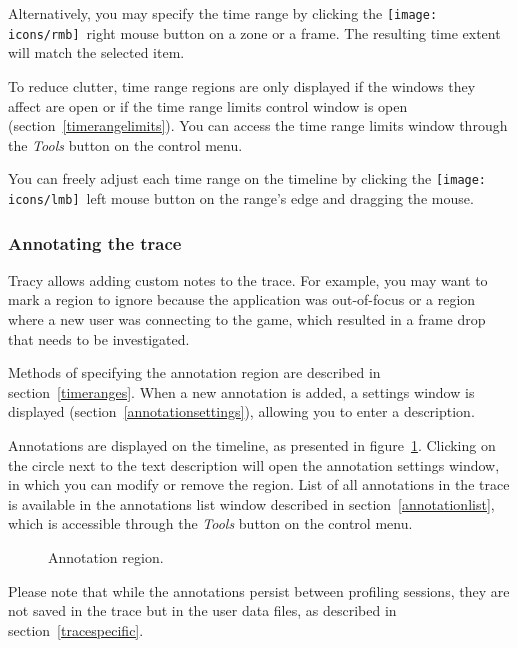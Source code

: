 \documentclass[hidelinks,titlepage,a4paper,twoside]{article}
\newcommand{\LMB}{\texttt{[image: icons/lmb]}}
\newcommand{\RMB}{\texttt{[image: icons/rmb]}}
\begin{document}
Alternatively, you may specify the time range by clicking the \RMB{}~right mouse button on a zone or a frame. The resulting time extent will match the selected item.

To reduce clutter, time range regions are only displayed if the windows they affect are open or if the time range limits control window is open (section~\ref{timerangelimits}). You can access the time range limits window through the \emph{\faTools{} Tools} button on the control menu.

You can freely adjust each time range on the timeline by clicking the \LMB{}~left mouse button on the range's edge and dragging the mouse.

\subsubsection{Annotating the trace}
\label{annotatingtrace}

Tracy allows adding custom notes to the trace. For example, you may want to mark a region to ignore because the application was out-of-focus or a region where a new user was connecting to the game, which resulted in a frame drop that needs to be investigated.

Methods of specifying the annotation region are described in section~\ref{timeranges}. When a new annotation is added, a settings window is displayed (section~\ref{annotationsettings}), allowing you to enter a description.

Annotations are displayed on the timeline, as presented in figure~\ref{annotation}. Clicking on the circle next to the text description will open the annotation settings window, in which you can modify or remove the region. List of all annotations in the trace is available in the annotations list window described in section~\ref{annotationlist}, which is accessible through the \emph{\faTools{} Tools} button on the control menu.

\begin{figure}[h]
\centering{}
\caption{Annotation region.}
\label{annotation}
\end{figure}

Please note that while the annotations persist between profiling sessions, they are not saved in the trace but in the user data files, as described in section~\ref{tracespecific}.
\end{document}
